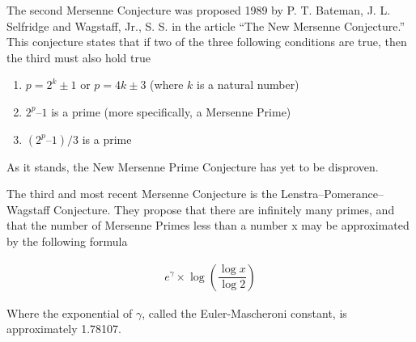 The second Mersenne Conjecture was proposed 1989 by P. T. Bateman, J. L. Selfridge and
Wagstaff, Jr., S. S. in the article “The New Mersenne Conjecture.” This conjecture states that if
two of the three following conditions are true, then the third must also hold true~\cite{utm.edu-newconjecture}

\begin{enumerate}
\item $p = 2^k \pm 1$ or $p = 4k \pm 3$ (where $k$ is a natural number)
\item $2^p – 1$ is a prime (more specifically, a Mersenne Prime)
\item $(2^p – 1)/3$ is a prime
\end{enumerate}

As it stands, the New Mersenne Prime Conjecture has yet to be disproven.

The third and most recent Mersenne Conjecture is the Lenstra–Pomerance–Wagstaff
Conjecture. They propose that there are infinitely many primes, and that the number of
Mersenne Primes less than a number x may be approximated by the following formula~\cite{utm.edu-heuristic}

\begin{align}
e^{\gamma} \times \log \left( \dfrac{\log{x}}{\log{2}} \right)
\end{align}

Where the exponential of $\gamma$, called the Euler-Mascheroni constant, is approximately
1.78107.
